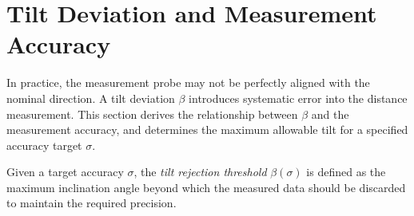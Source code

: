 \section{Tilt Deviation and Measurement Accuracy}
\label{sec:tilt}

In practice, the measurement probe may not be perfectly
aligned with the nominal direction.
%
A tilt deviation $\beta$ introduces systematic error into
the distance measurement.
%
This section derives the relationship between $\beta$ and
the measurement accuracy, and determines the maximum
allowable tilt for a specified accuracy target $\sigma$.

Given a target accuracy $\sigma$,
the \emph{tilt rejection threshold} $\beta(\sigma)$ is
defined as the maximum inclination angle beyond which
the measured data should be discarded to maintain the
required precision.

